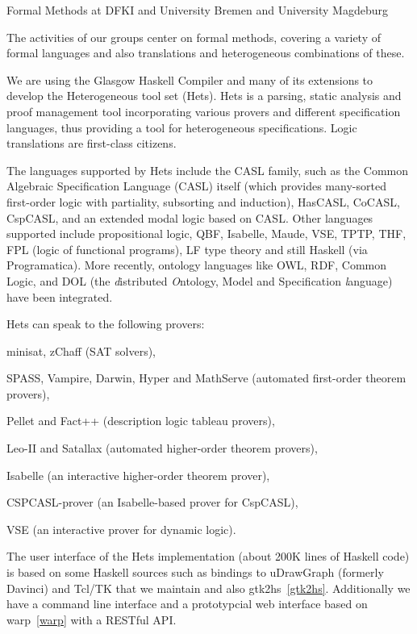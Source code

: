 \begin{hcarentry}[section]{Formal Methods at DFKI and University Bremen and University Magdeburg}
\makeheader

The activities of our groups center on formal methods, covering a
variety of formal languages and also translations and heterogeneous
combinations of these.

We are using the Glasgow Haskell Compiler and many of its extensions
to develop the Heterogeneous tool set (Hets).  Hets is a parsing,
static analysis and proof management tool incorporating various
provers and different specification languages, thus providing a tool
for heterogeneous specifications. Logic translations are first-class
citizens.

The languages supported by Hets include the CASL family, such as the Common
Algebraic Specification Language (CASL) itself (which provides many-sorted
first-order logic with partiality, subsorting and induction), HasCASL, CoCASL,
CspCASL, and an extended modal logic based on CASL. Other languages supported
include propositional logic, QBF, Isabelle, Maude, VSE, TPTP, THF, FPL (logic
of functional programs), LF type theory and still Haskell (via
Programatica). More recently, ontology languages like OWL, RDF, Common Logic,
and DOL (the \emph{d}istributed \emph{O}ntology, Model and Specification
\emph{l}anguage) have been integrated.

Hets can speak to the following provers:
\begin{compactitem}
\item
minisat, zChaff (SAT solvers),
\item
SPASS, Vampire, Darwin, Hyper and MathServe (automated first-order theorem provers),
\item
Pellet and Fact++ (description logic tableau provers),
\item
Leo-II and Satallax (automated higher-order theorem provers),
\item
Isabelle (an interactive higher-order theorem prover),
\item
CSPCASL-prover (an Isabelle-based prover for CspCASL),
\item VSE (an interactive prover for dynamic logic).
\end{compactitem}

The user interface of the Hets implementation (about 200K lines of
Haskell code) is based on some Haskell sources such as bindings to
uDrawGraph (formerly Davinci) and Tcl/TK that we maintain and also
gtk2hs~\cref{gtk2hs}.  Additionally we have a command line interface
and a prototypcial web interface based on warp~\cref{warp} with a
RESTful API.


\end{hcarentry}

